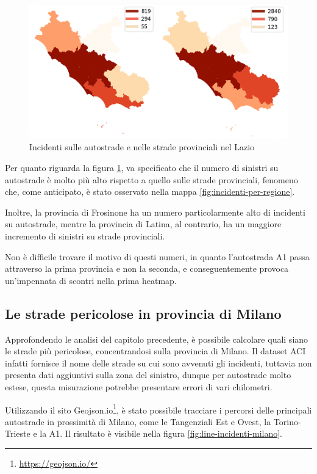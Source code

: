 \documentclass[a4paper,12pt]{report}
\begin{document}
\begin{figure}
    \includegraphics[width=\linewidth]{img_unite/lazio_autostrade_provinciali.png}
    \caption{Incidenti sulle autostrade e nelle strade provinciali nel Lazio}
    \label{fig:lazio-strade}
\end{figure}

Per quanto riguarda la figura \ref{fig:lazio-strade}, va 
specificato che il numero di sinistri su autostrade è molto più alto rispetto 
a quello sulle strade provinciali, fenomeno che, come anticipato, è stato osservato 
nella mappa \ref{fig:incidenti-per-regione}.

Inoltre, la provincia di Frosinone ha un numero particolarmente alto di incidenti su 
autostrade, mentre la provincia di Latina, al contrario, ha un maggiore incremento di 
sinistri su strade provinciali.

Non è difficile trovare il motivo di questi numeri, in quanto l'autostrada A1 passa 
attraverso la prima provincia e non la seconda, e conseguentemente provoca 
un'impennata di scontri nella prima heatmap. 

\subsection{Le strade pericolose in provincia di Milano}

Approfondendo le analisi del capitolo precedente, è possibile calcolare quali siano 
le strade più pericolose, concentrandosi sulla provincia di Milano. 
Il dataset ACI infatti fornisce il nome delle strade su cui sono avvenuti gli incidenti, 
tuttavia non presenta dati aggiuntivi sulla zona del sinistro, dunque per autostrade molto 
estese, questa misurazione potrebbe presentare errori di vari chilometri. 

Utilizzando il sito Geojson.io\footnote{\url{https://geojson.io/}}, 
è stato possibile tracciare i percorsi delle principali autostrade in prossimità di 
Milano, come le Tangenziali Est e Ovest, la Torino-Trieste e la A1. 
Il risultato è visibile nella figura \ref{fig:line-incidenti-milano}.
\end{document}

